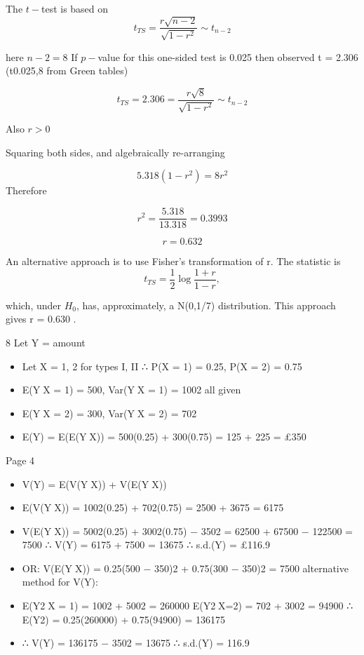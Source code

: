 \documentclass[a4paper,12pt]{article}
\begin{document}


The $t-$test is based on
\[ t_{TS} = \frac{r\sqrt{n-2}}{\sqrt{1-r^2}} \sim t_{n-2}\]

here $n − 2 = 8$
If $p-$value for this one-sided test is 0.025 then observed t = 2.306 (t0.025,8 from
Green tables)


\[ t_{TS} = 2.306 = \frac{r\sqrt{8}}{\sqrt{1-r^2}} \sim t_{n-2}\]

Also  $r > 0$

Squaring both sides, and algebraically re-arranging

\[5.318 (1 − r^2) = 8r^2\]
Therefore

\[r^2 = \frac{5.318}{13.318}=  0.3993\]

\[r = 0.632\]




An alternative approach is to use Fisher’s transformation of r. The
statistic is
\[ t_{TS} = \frac{1}{2} \log \frac{1+r}{1-r}, \]

which, under $H_0$, has, approximately, a N(0,1/7) distribution.
This approach gives r = 0.630 .


8 Let Y = amount
\begin{itemize}
    \item Let X = 1, 2 for types I, II
∴ P(X = 1) = 0.25, P(X = 2) = 0.75
\item E(YX = 1) = 500, Var(YX = 1) = 1002
all given
\item E(YX = 2) = 300, Var(YX = 2) = 702
\item E(Y) = E(E(YX)) = 500(0.25) + 300(0.75)
= 125 + 225 = £350

\end{itemize}

Page 4
\begin{itemize}
    \item V(Y) = E(V(YX)) + V(E(YX))
\item E(V(YX)) = 1002(0.25) + 702(0.75)
= 2500 + 3675 = 6175
\item V(E(YX)) = 5002(0.25) + 3002(0.75) − 3502
= 62500 + 67500 − 122500 = 7500
∴ V(Y) = 6175 + 7500 = 13675
∴ s.d.(Y) = £116.9
\item OR: V(E(YX)) = 0.25(500 − 350)2 + 0.75(300 − 350)2 = 7500
alternative method for V(Y):
\item E(Y2X = 1) = 1002 + 5002 = 260000
E(Y2X=2) = 702 + 3002 = 94900
∴ E(Y2) = 0.25(260000) + 0.75(94900)
= 136175
\item ∴ V(Y) = 136175 − 3502 = 13675
∴ s.d.(Y) = 116.9
\end{itemize}
\end{document}
